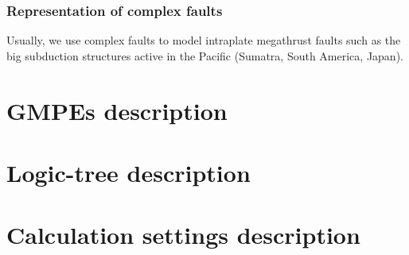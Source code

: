 \subsubsection{Representation of complex faults}
Usually, we use complex faults to model intraplate megathrust faults such as the 
big subduction structures active in the Pacific (Sumatra, South America, Japan).
%
\section{GMPEs description}
\label{hazard:gmpe_selection}
%
\section{Logic-tree description}
\label{hazard:logic_tree}
%
\section{Calculation settings description}
\label{hazard:calculation_settings}

